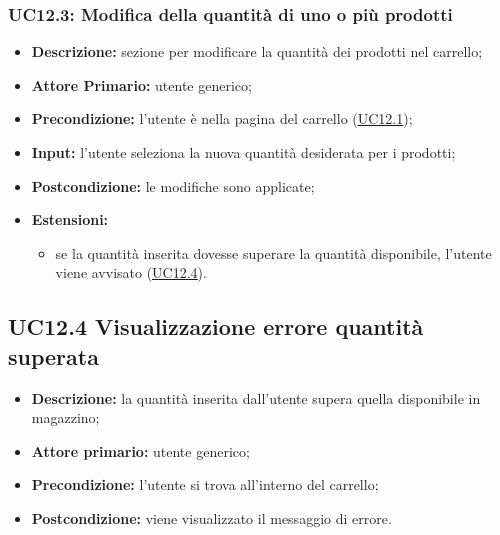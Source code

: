 \subsubsection{UC12.3: Modifica della quantità di uno o più prodotti}
\label{sec:UC12.3}
\begin{itemize}
    \item \textbf{Descrizione:} sezione per modificare la quantità dei prodotti nel carrello;
    \item \textbf{Attore Primario:} utente generico;
    \item \textbf{Precondizione:} l'utente è nella pagina del carrello (\hyperref[sec:UC12.1]{\underline{UC12.1}});
    \item \textbf{Input:} l'utente seleziona la nuova quantità desiderata per i prodotti;
    \item \textbf{Postcondizione:} le modifiche sono applicate;
    \item \textbf{Estensioni:}
          \begin{itemize}
              \item se la quantità inserita dovesse superare la quantità disponibile, l'utente viene avvisato (\hyperref[sec:UC12.4]{\underline{UC12.4}}).
          \end{itemize}
\end{itemize}
\subsection{UC12.4 Visualizzazione errore quantità superata}
\label{sec:UC12.4}
\begin{itemize}
    \item \textbf{Descrizione:} la quantità inserita dall'utente supera quella disponibile in magazzino;
    \item \textbf{Attore primario:} utente generico;
    \item \textbf{Precondizione:} l'utente si trova all'interno del carrello;
    \item \textbf{Postcondizione:} viene visualizzato il messaggio di errore.
\end{itemize}